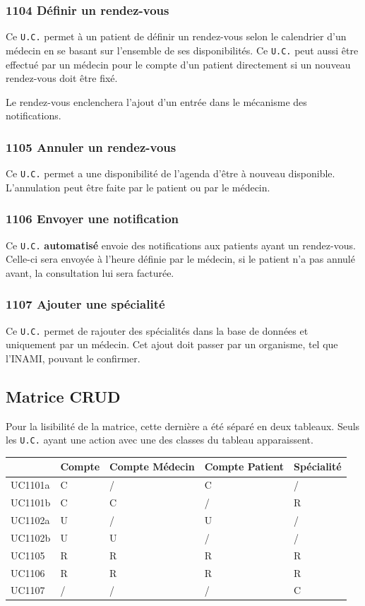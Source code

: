 \subsubsection{\label{1104}1104 Définir un rendez-vous}
Ce \texttt{U.C.} permet à un patient de définir un rendez-vous selon le
calendrier d'un médecin en se basant sur l'ensemble de ses disponibilités. 
Ce \texttt{U.C.} peut aussi être effectué par un médecin pour le compte d'un
patient directement si un nouveau rendez-vous doit être fixé.

Le rendez-vous enclenchera l'ajout d'un entrée dans le mécanisme des
notifications.
\subsubsection{\label{1105}1105 Annuler un rendez-vous}
Ce \texttt{U.C.} permet a une disponibilité de l'agenda d'être à nouveau
disponible. L'annulation peut être faite par le patient ou par le médecin. 
\subsubsection{\label{1106}1106 Envoyer une notification}
Ce \texttt{U.C.} \textbf{automatisé} envoie des notifications aux patients ayant
un rendez-vous. Celle-ci sera envoyée à l'heure définie par le médecin, si le
patient n'a pas annulé avant, la consultation lui sera facturée.
\subsubsection{\label{1107}1107 Ajouter une spécialité}
Ce \texttt{U.C.} permet de rajouter des spécialités dans la base de données et
uniquement par un médecin. Cet ajout doit passer par un organisme, tel que
l'INAMI, pouvant le confirmer.
\newpage
\subsection{Matrice CRUD}

Pour la lisibilité de la matrice, cette dernière a été séparé en deux tableaux.
Seuls les \texttt{U.C.} ayant une action avec une des classes du tableau apparaissent.

\begin{center}
	\begin{longtable}{|p{1.5cm}|p{1.5cm}|p{1.5cm}|p{1.5cm}|p{1.5cm}|}
		\hline
		& Compte & Compte Médecin & Compte Patient & Spécialité \\
		\hline
		UC1101a & C & / & C & / \\
		\hline
		UC1101b & C & C & / & R \\
		\hline
		UC1102a & U & / & U & / \\
		\hline
        UC1102b & U & U & / & / \\
        \hline
		UC1105  & R & R & R & R \\
		\hline
		UC1106 & R & R & R & R \\
		\hline
        UC1107 & / & / & / & C \\
        \hline

	\end{longtable}
\end{center}

